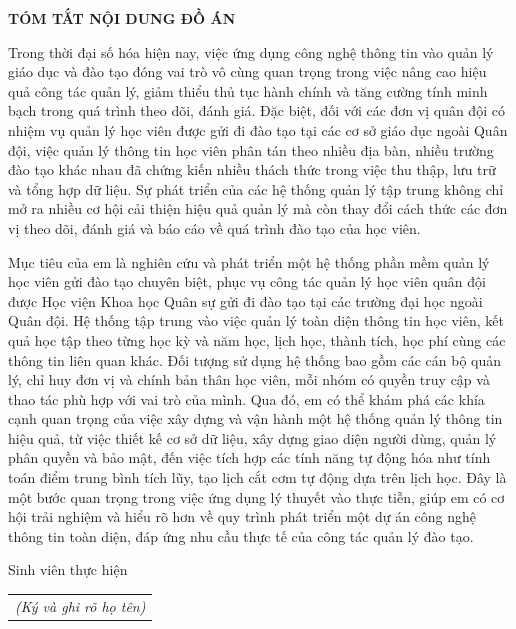 \documentclass[../DoAn.tex]{subfiles}
\begin{document}
\begin{center}
    \Large{\textbf{TÓM TẮT NỘI DUNG ĐỒ ÁN}}\\
\end{center}
\vspace{1cm}
Trong thời đại số hóa hiện nay, việc ứng dụng công nghệ thông tin vào quản lý giáo dục và đào tạo đóng vai trò vô cùng quan trọng trong việc nâng cao hiệu quả công tác quản lý, giảm thiểu thủ tục hành chính và tăng cường tính minh bạch trong quá trình theo dõi, đánh giá. Đặc biệt, đối với các đơn vị quân đội có nhiệm vụ quản lý học viên được gửi đi đào tạo tại các cơ sở giáo dục ngoài Quân đội, việc quản lý thông tin học viên phân tán theo nhiều địa bàn, nhiều trường đào tạo khác nhau đã chứng kiến nhiều thách thức trong việc thu thập, lưu trữ và tổng hợp dữ liệu. Sự phát triển của các hệ thống quản lý tập trung không chỉ mở ra nhiều cơ hội cải thiện hiệu quả quản lý mà còn thay đổi cách thức các đơn vị theo dõi, đánh giá và báo cáo về quá trình đào tạo của học viên.

Mục tiêu của em là nghiên cứu và phát triển một hệ thống phần mềm quản lý học viên gửi đào tạo chuyên biệt, phục vụ công tác quản lý học viên quân đội được Học viện Khoa học Quân sự gửi đi đào tạo tại các trường đại học ngoài Quân đội. Hệ thống tập trung vào việc quản lý toàn diện thông tin học viên, kết quả học tập theo từng học kỳ và năm học, lịch học, thành tích, học phí cùng các thông tin liên quan khác. Đối tượng sử dụng hệ thống bao gồm các cán bộ quản lý, chỉ huy đơn vị và chính bản thân học viên, mỗi nhóm có quyền truy cập và thao tác phù hợp với vai trò của mình. Qua đó, em có thể khám phá các khía cạnh quan trọng của việc xây dựng và vận hành một hệ thống quản lý thông tin hiệu quả, từ việc thiết kế cơ sở dữ liệu, xây dựng giao diện người dùng, quản lý phân quyền và bảo mật, đến việc tích hợp các tính năng tự động hóa như tính toán điểm trung bình tích lũy, tạo lịch cắt cơm tự động dựa trên lịch học. Đây là một bước quan trọng trong việc ứng dụng lý thuyết vào thực tiễn, giúp em có cơ hội trải nghiệm và hiểu rõ hơn về quy trình phát triển một dự án công nghệ thông tin toàn diện, đáp ứng nhu cầu thực tế của công tác quản lý đào tạo. 
\begin{flushright}
Sinh viên thực hiện\\
\begin{tabular}{@{}c@{}}
\textit{(Ký và ghi rõ họ tên)}
\end{tabular}
\end{flushright}
\end{document}
